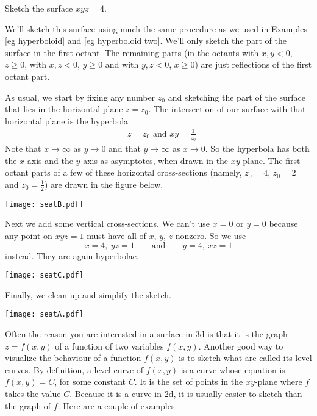\bigskip
\begin{eg}[$xyz=4$]\label{eg xyz}
\medskip
Sketch the surface $xyz=4$. 

\soln
We'll sketch this surface using much the same procedure as we used
in Examples \ref{eg hyperboloid} and \ref{eg hyperboloid two}.
We'll only sketch the part of the surface in the first octant. The
remaining parts (in the octants with $x,y<0$, $z\ge 0$, with
$x,z<0$, $y\ge 0$ and with $y,z<0$, $x\ge0$) are just reflections of
the first octant part.

As usual, we start by fixing any number $z_0$ 
and sketching the part of the surface that lies in the horizontal 
plane $z=z_0$. The intersection of our surface with that horizontal plane is 
the hyperbola
\begin{align*}
&z=z_0\text{\  \ and\ \ }xy=\frac{1}{z_0}
\end{align*}
Note that $x\rightarrow\infty$ as $y\rightarrow 0$ and that 
$y\rightarrow\infty$ as $x\rightarrow 0$. So the hyperbola 
has both the $x$-axis and the $y$-axis as asymptotes, when drawn in the $xy$-plane. 
The first octant parts of a few of these horizontal cross-sections 
(namely, $z_0=4$, $z_0=2$ and $z_0=\frac{1}{2}$)
are drawn in the figure below.
\begin{efig}
\begin{center}
   \texttt{[image: seatB.pdf]}
\end{center}
\end{efig}
Next we add some vertical cross-sections.
We can't use $x=0$ or $y=0$ because any point on $xyz=1$ 
must have all of $x$, $y$, $z$ nonzero. So we use
\begin{equation*}
x=4,\ yz=1\qquad\text{and}\qquad
y=4,\ xz=1
\end{equation*}
instead. They are again hyperbolae.
\begin{efig}
\begin{center}
   \texttt{[image: seatC.pdf]}
\end{center}
\end{efig}
Finally, we clean up and simplify the sketch.
\begin{efig}
\begin{center}
   \texttt{[image: seatA.pdf]}
\end{center}
\end{efig}

\end{eg}

Often the reason you are interested in a surface in 3d is that it is
the graph $z=f(x,y)$ of a function of two variables $f(x,y)$. Another good
way to visualize the behaviour of a function $f(x,y)$ is to sketch what
are called its level curves. By definition, a level curve of $f(x,y)$
is a curve whose equation is $f(x,y)=C$, for some constant $C$. It is the
set of points in the $xy$-plane where $f$ takes the value $C$. Because
it is a curve in 2d, it is usually easier to sketch than the graph of $f$.
Here are a couple of examples. 

